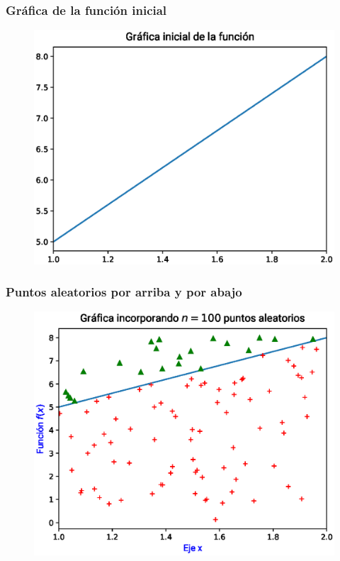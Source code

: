 \documentclass[12pt]{beamer}
\begin{document}
\begin{frame}
\frametitle{Gráfica de la función inicial}
\begin{figure}
	\centering
	\includegraphics[scale=0.55]{Imagenes/area_puntos_01.eps}
\end{figure}
\end{frame}
\begin{frame}
\frametitle{Puntos aleatorios por arriba y por abajo}
\begin{figure}
    \centering
    \includegraphics[scale=0.55]{Imagenes/area_puntos_02.eps}
\end{figure}
\end{frame}
\end{document}
